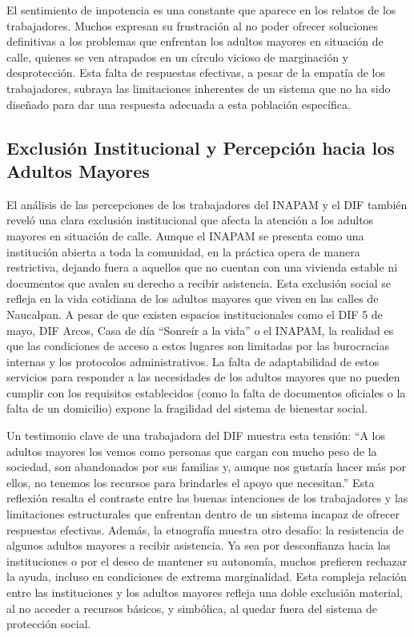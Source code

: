 \documentclass[
  spanish,
  11pt,
  a4paper,
]{scrbook}
\begin{document}
El sentimiento de impotencia es una constante que aparece en los relatos
de los trabajadores. Muchos expresan su frustración al no poder ofrecer
soluciones definitivas a los problemas que enfrentan los adultos mayores
en situación de calle, quienes se ven atrapados en un círculo vicioso de
marginación y desprotección. Esta falta de respuestas efectivas, a pesar
de la empatía de los trabajadores, subraya las limitaciones inherentes
de un sistema que no ha sido diseñado para dar una respuesta adecuada a
esta población específica.

\subsection*{Exclusión Institucional y Percepción hacia los Adultos
Mayores}\label{exclusiuxf3n-institucional-y-percepciuxf3n-hacia-los-adultos-mayores}

El análisis de las percepciones de los trabajadores del INAPAM y el DIF
también reveló una clara exclusión institucional que afecta la atención
a los adultos mayores en situación de calle. Aunque el INAPAM se
presenta como una institución abierta a toda la comunidad, en la
práctica opera de manera restrictiva, dejando fuera a aquellos que no
cuentan con una vivienda estable ni documentos que avalen su derecho a
recibir asistencia. Esta exclusión social se refleja en la vida
cotidiana de los adultos mayores que viven en las calles de Naucalpan. A
pesar de que existen espacios institucionales como el DIF 5 de mayo, DIF
Arcos, Casa de día ``Sonreír a la vida'' o el INAPAM, la realidad es que
las condiciones de acceso a estos lugares son limitadas por las
burocracias internas y los protocolos administrativos. La falta de
adaptabilidad de estos servicios para responder a las necesidades de los
adultos mayores que no pueden cumplir con los requisitos establecidos
(como la falta de documentos oficiales o la falta de un domicilio)
expone la fragilidad del sistema de bienestar social.

Un testimonio clave de una trabajadora del DIF muestra esta tensión: ``A
los adultos mayores los vemos como personas que cargan con mucho peso de
la sociedad, son abandonados por sus familias y, aunque nos gustaría
hacer más por ellos, no tenemos los recursos para brindarles el apoyo
que necesitan.'' Esta reflexión resalta el contraste entre las buenas
intenciones de los trabajadores y las limitaciones estructurales que
enfrentan dentro de un sistema incapaz de ofrecer respuestas efectivas.
Además, la etnografía muestra otro desafío: la resistencia de algunos
adultos mayores a recibir asistencia. Ya sea por desconfianza hacia las
instituciones o por el deseo de mantener su autonomía, muchos prefieren
rechazar la ayuda, incluso en condiciones de extrema marginalidad. Esta
compleja relación entre las instituciones y los adultos mayores refleja
una doble exclusión material, al no acceder a recursos básicos, y
simbólica, al quedar fuera del sistema de protección social.
\end{document}
